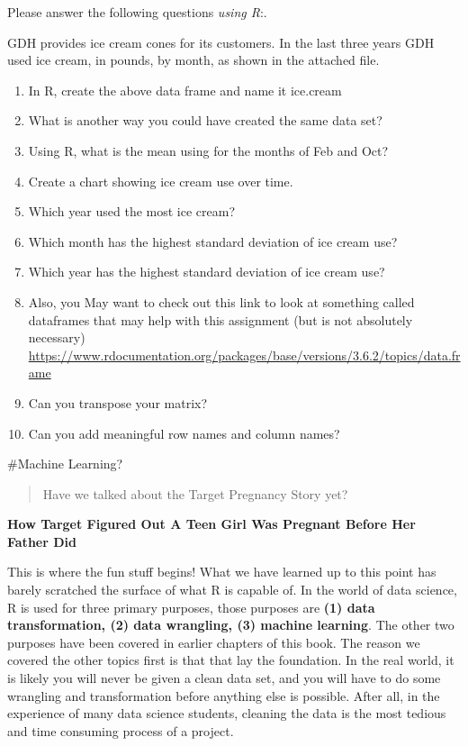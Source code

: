 \documentclass[
]{book}
\providecommand{\tightlist}{%
  \setlength{\itemsep}{0pt}\setlength{\parskip}{0pt}}
\begin{document}
Please answer the following questions \emph{using R}:.

GDH provides ice cream cones for its customers. In the last three years GDH used ice cream, in pounds, by month, as shown in the attached file.

\begin{enumerate}
\def\labelenumi{\arabic{enumi}.}
\tightlist
\item
  In R, create the above data frame and name it ice.cream
\item
  What is another way you could have created the same data set?
\item
  Using R, what is the mean using for the months of Feb and Oct?
\item
  Create a chart showing ice cream use over time.
\item
  Which year used the most ice cream?
\item
  Which month has the highest standard deviation of ice cream use?
\item
  Which year has the highest standard deviation of ice cream use?
\item
  Also, you May want to check out this link to look at something called dataframes that may help with this assignment (but is not absolutely necessary) \url{https://www.rdocumentation.org/packages/base/versions/3.6.2/topics/data.frame}
\item
  Can you transpose your matrix?
\item
  Can you add meaningful row names and column names?
\end{enumerate}

\#Machine Learning?

\begin{quote}
Have we talked about the Target Pregnancy Story yet?
\end{quote}

\textbf{How Target Figured Out A Teen Girl Was Pregnant Before Her Father Did}

This is where the fun stuff begins! What we have learned up to this point has barely scratched the surface of what R is capable of. In the world of data science, R is used for three primary purposes, those purposes are \textbf{(1) data transformation, (2) data wrangling, (3) machine learning}. The other two purposes have been covered in earlier chapters of this book. The reason we covered the other topics first is that that lay the foundation. In the real world, it is likely you will never be given a clean data set, and you will have to do some wrangling and transformation before anything else is possible. After all, in the experience of many data science students, cleaning the data is the most tedious and time consuming process of a project.
\end{document}
